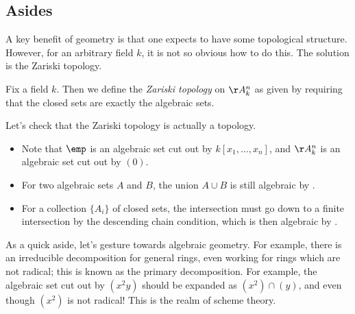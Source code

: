 \documentclass[../notes.tex]{subfiles}
\begin{document}
\subsection{Asides}
A key benefit of geometry is that one expects to have some topological structure. However, for an arbitrary field $k$, it is not so obvious how to do this. The solution is the Zariski topology.
\begin{definition}
	Fix a field $k$. Then we define the \textit{Zariski topology} on $\AA^n_k$ as given by requiring that the closed sets are exactly the algebraic sets.
\end{definition}
\begin{remark}
	Let's check that the Zariski topology is actually a topology.
	\begin{itemize}
		\item Note that $\emp$ is an algebraic set cut out by $k[x_1,\ldots,x_n]$, and $\AA^n_k$ is an algebraic set cut out by $(0)$.
		\item For two algebraic sets $A$ and $B$, the union $A\cup B$ is still algebraic by .
		\item For a collection $\{A_i\}$ of closed sets, the intersection must go down to a finite intersection by the descending chain condition, which is then algebraic by .
	\end{itemize}
\end{remark}
As a quick aside, let's gesture towards algebraic geometry. For example, there is an irreducible decomposition for general rings, even working for rings which are not radical; this is known as the primary decomposition. For example, the algebraic set cut out by $\left(x^2y\right)$ should be expanded as $\left(x^2\right)\cap(y)$, and even though $\left(x^2\right)$ is not radical! This is the realm of scheme theory.
\end{document}
